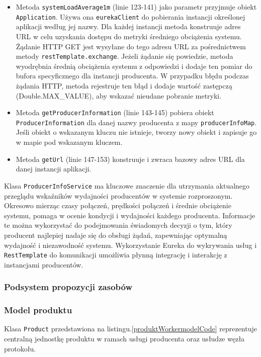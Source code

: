 \begin{itemize}
    \item Metoda \verb|systemLoadAverage1m| (linie 123-141) jako parametr przyjmuje obiekt \verb|Application|. Używa ona \verb|eurekaClient| do pobierania instancji określonej aplikacji według jej nazwy. Dla każdej instancji metoda konstruuje adres URL w celu uzyskania dostępu do metryki średniego obciążenia systemu. Żądanie HTTP GET jest wysyłane do tego adresu URL za pośrednictwem metody \verb|restTemplate.exchange|. Jeżeli żądanie się powiedzie, metoda wyodrębnia średnią obciążenia systemu z odpowiedzi i dodaje ten pomiar do bufora specyficznego dla instancji producenta. W przypadku błędu podczas żądania HTTP, metoda rejestruje ten błąd i dodaje wartość zastępczą (Double.MAX\_VALUE), aby wskazać nieudane pobranie metryki.
    \item Metoda \verb|getProducerInformation| (linie 143-145) pobiera obiekt \verb|ProducerInformation| dla danej nazwy producenta z mapy \verb|producerInfoMap|. Jeśli obiekt o wskazanym kluczu nie istnieje, tworzy nowy obiekt i zapisuje go w mapie pod wskazanym kluczem.
    \item Metoda \verb|getUrl| (linie 147-153) konstruuje i zwraca bazowy adres URL dla danej instancji aplikacji.
\end{itemize}

Klasa \verb|ProducerInfoService| ma kluczowe znaczenie dla utrzymania aktualnego przeglądu wskaźników wydajności producentów w systemie rozproszonym. Okresowo mierząc czasy połączeń, prędkości połączeń i średnie obciążenie systemu, pomaga w ocenie kondycji i wydajności każdego producenta. Informacje te można wykorzystać do podejmowania świadomych decyzji o tym, który producent najlepiej nadaje się do obsługi żądań, zapewniając optymalną wydajność i niezawodność systemu. Wykorzystanie Eureka do wykrywania usług i \verb|RestTemplate| do komunikacji  umożliwia płynną integrację i interakcję z instancjami producentów.

\subsubsection{Podsystem propozycji zasobów}

\subsubsection{Model produktu}

Klasa \verb|Product| przedstawiona na listingu.\ref{produktWorkermodelCode} reprezentuje centralną jednostkę produktu w ramach usługi producenta oraz usłudze węzła protokołu.

